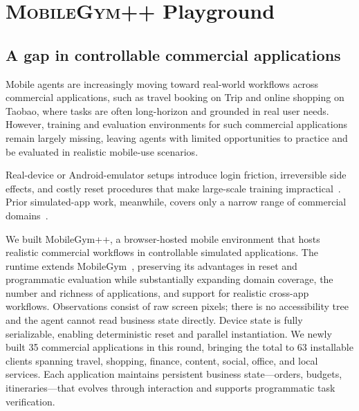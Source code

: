\section{\textsc{MobileGym++} Playground}
\label{sec:mobilegym++}
\label{sec:method}

\subsection{A gap in controllable commercial applications}
\label{sec:mgpp-env}

Mobile agents are increasingly moving toward real-world workflows across commercial applications, such as travel booking on Trip and online shopping on Taobao, where tasks are often long-horizon and grounded in real user needs. However, training and evaluation environments for such commercial applications remain largely missing, leaving agents with limited opportunities to practice and be evaluated in realistic mobile-use scenarios.

Real-device or Android-emulator setups introduce login friction, irreversible side effects, and costly reset procedures that make large-scale training impractical~\citep{rawles2025androidworld,kong2026mobileworld}. Prior simulated-app work, meanwhile, covers only a narrow range of commercial domains~\citep{wu2026mobilegym,trivedi2024appworld}.

We built MobileGym++, a browser-hosted mobile environment that hosts realistic commercial workflows in controllable simulated applications. The runtime extends MobileGym~\citep{wu2026mobilegym}, preserving its advantages in reset and programmatic evaluation while substantially expanding domain coverage, the number and richness of applications, and support for realistic cross-app workflows. Observations consist of raw screen pixels; there is no accessibility tree and the agent cannot read business state directly. Device state is fully serializable, enabling deterministic reset and parallel instantiation. We newly built 35 commercial applications in this round, bringing the total to 63 installable clients spanning travel, shopping, finance, content, social, office, and local services. Each application maintains persistent business state---orders, budgets, itineraries---that evolves through interaction and supports programmatic task verification.


